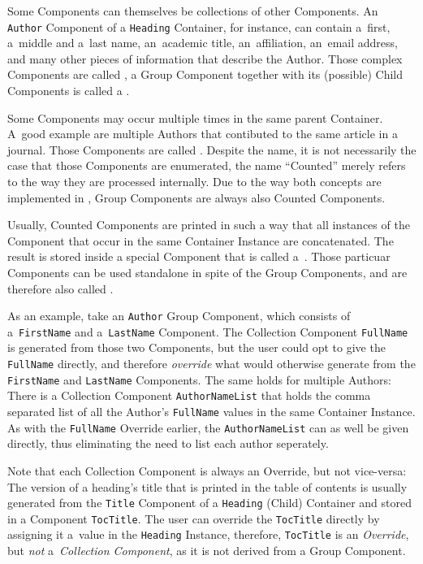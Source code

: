 Some Components can themselves be collections of other Components. An
\texttt{Author} Component of a \texttt{Heading} Container, for
instance, can contain a~first, a~middle and a~last name, an~academic
title, an~affiliation, an~email address, and many other pieces of
information that describe the Author. Those complex Components are
called , a Group Component together with
its (possible) Child Components is called a .

Some Components may occur multiple times in the same parent
Container. A~good example are multiple Authors that contibuted to the
same article in a journal. Those Components are called
.  Despite the name,
it is not necessarily the case that those Components are enumerated,
the name “Counted” merely refers to the way they are processed
internally. Due to the way both concepts are implemented in
{\CoCoTeX}, Group Components are always also Counted Components.

Usually, Counted Components are printed in such a way that all
instances of the Component that occur in the same Container Instance
are concatenated.  The result is stored inside a special Component
that is called a~. Those particuar
Components can be used standalone in spite of the Group Components,
and are therefore also called .

As an example, take an \texttt{Author} Group Component, which consists
of a~\texttt{FirstName} and a~\texttt{LastName} Component. The
Collection Component \texttt{FullName} is generated from those two
Components, but the user could opt to give the \texttt{FullName}
directly, and therefore \textit{override} what {\CoCoTeX} would
otherwise generate from the \texttt{FirstName} and \texttt{LastName}
Components. The same holds for multiple Authors: There is a Collection
Component \texttt{AuthorNameList} that holds the comma separated list
of all the Author's \texttt{FullName} values in the same Container
Instance. As with the \texttt{FullName} Override earlier, the
\texttt{AuthorNameList} can as well be given directly, thus
eliminating the need to list each author seperately.

Note that each Collection Component is always an Override, but not
vice-versa: The version of a heading's title that is printed in the
table of contents is usually generated from the \texttt{Title}
Component of a \texttt{Heading} (Child) Container and stored in a
Component \texttt{TocTitle}. The user can override the
\texttt{TocTitle} directly by assigning it a~value in the
\texttt{Heading} Instance, therefore, \texttt{TocTitle} is an
\textit{Override}, but \textit{not} a~\textit{Collection Component},
as it is not derived from a Group Component.

